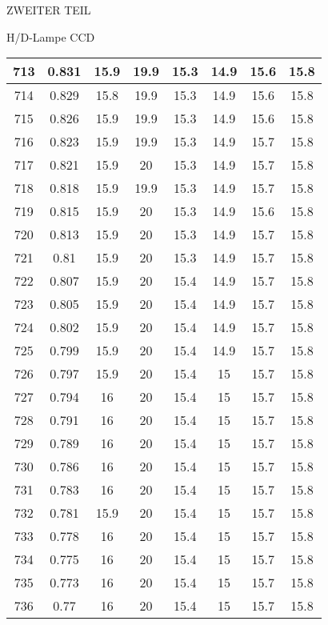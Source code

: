 \begin{appendix}
\begin{chapter}{ZWEITER TEIL}
\begin{section}{H/D-Lampe CCD}
\begin{scriptsize}
\begin{longtable}[htbp]{|c|c|c|c|c|c|c|c|}
            713 & 0.831 & 15.9 & 19.9 & 15.3 & 14.9 & 15.6 & 15.8 \\ \hline
            714 & 0.829 & 15.8 & 19.9 & 15.3 & 14.9 & 15.6 & 15.8 \\ \hline
            715 & 0.826 & 15.9 & 19.9 & 15.3 & 14.9 & 15.6 & 15.8 \\ \hline
            716 & 0.823 & 15.9 & 19.9 & 15.3 & 14.9 & 15.7 & 15.8 \\ \hline
            717 & 0.821 & 15.9 & 20 & 15.3 & 14.9 & 15.7 & 15.8 \\ \hline
            718 & 0.818 & 15.9 & 19.9 & 15.3 & 14.9 & 15.7 & 15.8 \\ \hline
            719 & 0.815 & 15.9 & 20 & 15.3 & 14.9 & 15.6 & 15.8 \\ \hline
            720 & 0.813 & 15.9 & 20 & 15.3 & 14.9 & 15.7 & 15.8 \\ \hline
            721 & 0.81 & 15.9 & 20 & 15.3 & 14.9 & 15.7 & 15.8 \\ \hline
            722 & 0.807 & 15.9 & 20 & 15.4 & 14.9 & 15.7 & 15.8 \\ \hline
            723 & 0.805 & 15.9 & 20 & 15.4 & 14.9 & 15.7 & 15.8 \\ \hline
            724 & 0.802 & 15.9 & 20 & 15.4 & 14.9 & 15.7 & 15.8 \\ \hline
            725 & 0.799 & 15.9 & 20 & 15.4 & 14.9 & 15.7 & 15.8 \\ \hline
            726 & 0.797 & 15.9 & 20 & 15.4 & 15 & 15.7 & 15.8 \\ \hline
            727 & 0.794 & 16 & 20 & 15.4 & 15 & 15.7 & 15.8 \\ \hline
            728 & 0.791 & 16 & 20 & 15.4 & 15 & 15.7 & 15.8 \\ \hline
            729 & 0.789 & 16 & 20 & 15.4 & 15 & 15.7 & 15.8 \\ \hline
            730 & 0.786 & 16 & 20 & 15.4 & 15 & 15.7 & 15.8 \\ \hline
            731 & 0.783 & 16 & 20 & 15.4 & 15 & 15.7 & 15.8 \\ \hline
            732 & 0.781 & 15.9 & 20 & 15.4 & 15 & 15.7 & 15.8 \\ \hline
            733 & 0.778 & 16 & 20 & 15.4 & 15 & 15.7 & 15.8 \\ \hline
            734 & 0.775 & 16 & 20 & 15.4 & 15 & 15.7 & 15.8 \\ \hline
            735 & 0.773 & 16 & 20 & 15.4 & 15 & 15.7 & 15.8 \\ \hline
            736 & 0.77 & 16 & 20 & 15.4 & 15 & 15.7 & 15.8 \\ \hline

\end{longtable}
\end{scriptsize}
\end{section}
\end{chapter}
\end{appendix}
